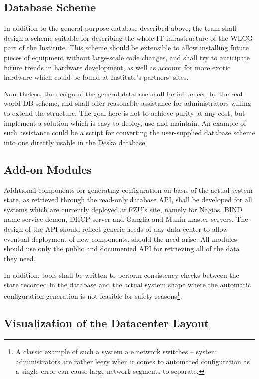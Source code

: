 \documentclass{article}
\begin{document}
\subsection{Database Scheme}

In addition to the general-purpose database described above, the team shall design a scheme suitable for describing the whole IT
infrastructure of the WLCG part of the Institute.  This scheme should be extensible to allow installing future pieces of equipment
without large-scale code changes, and shall try to anticipate future trends in hardware development, as well as account for more
exotic hardware which could be found at Institute's partners' sites.

Nonetheless, the design of the general database shall be influenced by the real-world DB scheme, and shall offer reasonable
assistance for administrators willing to extend the structure.  The goal here is not to achieve purity at any cost, but implement
a solution which is easy to deploy, use and maintain. An example of such assistance could be a script for converting the
user-supplied database scheme into one directly usable in the Deska database. 

\subsection{Add-on Modules}

Additional components for generating configuration on basis of the actual system state, as retrieved through the read-only
database API, shall be developed for all systems which are currently deployed at FZU's site, namely for Nagios, BIND name service
demon, DHCP server and Ganglia and Munin master servers.  The design of the API should reflect generic needs of any data center to
allow eventual deployment of new components, should the need arise.  All modules should use only the public and documented API for
retrieving all of the data they need.

In addition, tools shall be written to perform consistency checks between the state recorded in the database and the actual system
shape where the automatic configuration generation is not feasible for safety reasons\footnote{A classic example of such a system
are network switches -- system administrators are rather leery when it comes to automated configuration as a single error can
cause large network segments to separate.}.

\subsection{Visualization of the Datacenter Layout}
\end{document}
